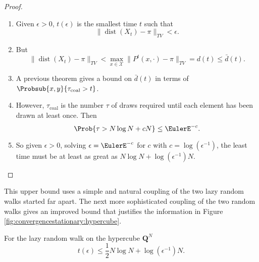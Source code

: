 \documentclass[12pt]{article}
\begin{document}
\begin{proof}
    \begin{enumerate}
        \item
            Given \( \epsilon > 0 \), \( t(\epsilon) \) is the smallest
            time \( t \) such that
            \[
                \|
                \operatorname{dist}
                (X_t) - \pi \|_{TV} < \epsilon.
            \]
        \item
            But
            \[
                \|
                \operatorname{dist}
                (X_t) - \pi \|_{TV} < \max_{x \in \mathcal{X}} \| P^t(x,
                \cdot) - \pi \|_{TV} = d(t) \le \bar{d}(t).
            \]
        \item
            A previous theorem gives a bound on \( \bar{d}(t) \) in
            terms of \( \Probsub{x,y}{\tau_{\text{coal}} > t} \).
        \item
            However, \( \tau_{\text{coal}} \) is the number \( \tau \)
            of draws required until each element has been drawn at least
            once.  Then
            \[
                \Prob{\tau > N \log N + c N} \le \EulerE^{-c}.
            \]
        \item
            So given \( \epsilon > 0 \), solving \( \epsilon = \EulerE^{-c}
            \) for \( c \) with \( c = \log(\epsilon^{-1}) \), the least
            time must be at least as great as \( N \log N + \log(\epsilon^
            {-1}) N \).
    \end{enumerate}
\end{proof}


\begin{remark}
    This upper bound uses a simple and natural coupling of the two lazy
    random walks started far apart.  The next more sophisticated
    coupling of the two random walks gives an improved bound that
    justifies the information in Figure~%
    \ref{fig:convergencestationary:hypercube}.
\end{remark}

\begin{theorem}
    For the lazy random walk on the hypercube \( \mathbf{Q}^N \)
    \[
        t(\epsilon) \le \frac{1}{2} N \log N + \log(\epsilon^{-1}) N.
    \]
\end{theorem}
\end{document}
